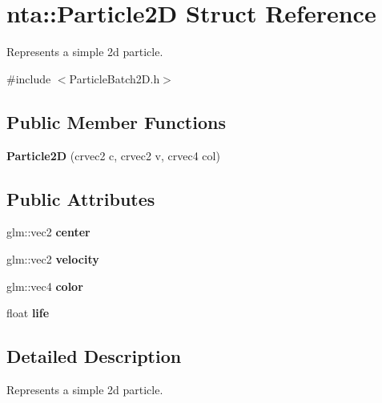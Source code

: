 \hypertarget{structnta_1_1Particle2D}{}\section{nta\+:\+:Particle2D Struct Reference}
\label{structnta_1_1Particle2D}


Represents a simple 2d particle.  




{\ttfamily \#include $<$Particle\+Batch2\+D.\+h$>$}

\subsection*{Public Member Functions}
\begin{DoxyCompactItemize}
\item 
\mbox{\label{structnta_1_1Particle2D_abfe29bfc0b8719eeb17df8268368ce52}} 
{\bfseries Particle2D} (crvec2 c, crvec2 v, crvec4 col)
\end{DoxyCompactItemize}
\subsection*{Public Attributes}
\begin{DoxyCompactItemize}
\item 
\mbox{\label{structnta_1_1Particle2D_a47ae411f47152a2b064dc216692302be}} 
glm\+::vec2 {\bfseries center}
\item 
\mbox{\label{structnta_1_1Particle2D_a7194c7ec065b7221ed61c861595cabb5}} 
glm\+::vec2 {\bfseries velocity}
\item 
\mbox{\label{structnta_1_1Particle2D_a3d3233a4de4f2c2b46715dd9a7187994}} 
glm\+::vec4 {\bfseries color}
\item 
\mbox{\label{structnta_1_1Particle2D_acfae159a4e2072f7896fac058e11e66f}} 
float {\bfseries life}
\end{DoxyCompactItemize}


\subsection{Detailed Description}
Represents a simple 2d particle. 

